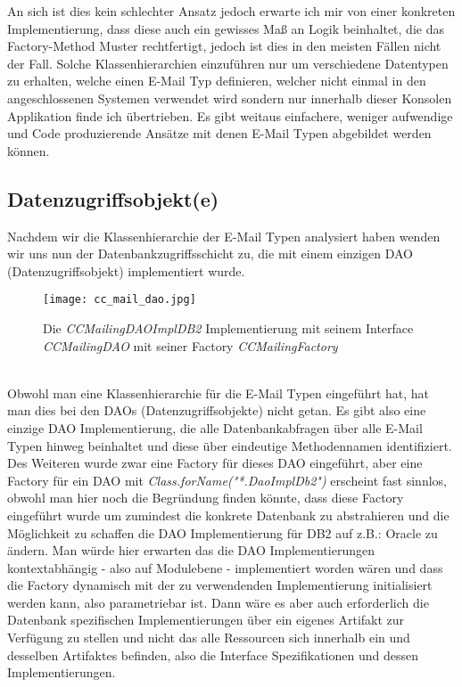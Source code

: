 An sich ist dies kein schlechter Ansatz jedoch erwarte ich mir von einer konkreten Implementierung, dass diese auch ein gewisses Maß an Logik beinhaltet, die das Factory-Method Muster rechtfertigt, jedoch ist dies in den meisten Fällen nicht der Fall. Solche Klassenhierarchien einzuführen nur um verschiedene Datentypen zu erhalten, welche einen E-Mail Typ definieren, welcher nicht einmal in den angeschlossenen Systemen verwendet wird sondern nur innerhalb dieser Konsolen Applikation finde ich übertrieben. Es gibt weitaus einfachere, weniger aufwendige und Code produzierende Ansätze mit denen E-Mail Typen abgebildet werden können.

\newpage
\subsection{Datenzugriffsobjekt(e)}
Nachdem wir die Klassenhierarchie der E-Mail Typen analysiert haben wenden wir uns nun der Datenbankzugriffsschicht zu, die mit einem einzigen DAO (Datenzugriffsobjekt) implementiert wurde.
\begin{figure}[h]
\centering
\texttt{[image: cc\_mail\_dao.jpg]} 
\caption{Die \emph{CCMailingDAOImplDB2} Implementierung mit seinem Interface \emph{CCMailingDAO} mit seiner Factory \emph{CCMailingFactory}}
\label{fig:class-hierarchie-email}
\end{figure}
\ \\
Obwohl man eine Klassenhierarchie für die E-Mail Typen eingeführt hat, hat man dies bei den DAOs (Datenzugriffsobjekte) nicht getan. Es gibt also eine einzige DAO Implementierung, die alle Datenbankabfragen über alle E-Mail Typen hinweg beinhaltet und diese über eindeutige Methodennamen identifiziert. Des Weiteren wurde zwar eine Factory für dieses DAO eingeführt, aber eine Factory für ein DAO mit \emph{Class.forName("*.DaoImplDb2")} erscheint fast sinnlos, obwohl man hier noch die Begründung finden könnte, dass diese Factory eingeführt wurde um zumindest die konkrete Datenbank zu abstrahieren und die Möglichkeit zu schaffen die DAO Implementierung für DB2 auf z.B.: Oracle zu ändern. Man würde hier erwarten das die DAO Implementierungen kontextabhängig - also auf Modulebene - implementiert worden wären und dass die Factory dynamisch mit der zu verwendenden Implementierung initialisiert werden kann, also parametriebar ist. Dann wäre es aber auch erforderlich die Datenbank spezifischen Implementierungen über ein eigenes Artifakt zur Verfügung zu stellen und nicht das alle Ressourcen sich innerhalb ein und desselben Artifaktes befinden, also die Interface Spezifikationen und dessen Implementierungen.

